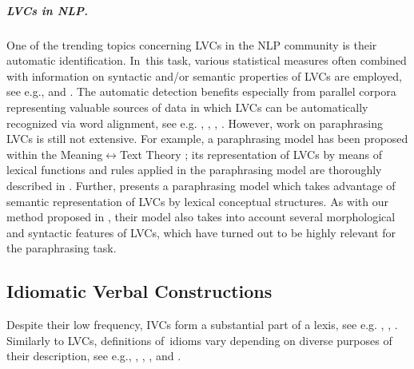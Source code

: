 \documentclass[output=paper
,modfonts
,nonflat]{langsci/langscibook}
\def\footurl#1{\footnote{\url{#1}}}
\begin{document}
\subparagraph{LVCs in NLP.} 
One of the trending topics concerning LVCs in the NLP community is their automatic 
identification. In~this task, various statistical measures often 
combined with information on syntactic and/or semantic properties of LVCs are
employed, see e.g., \citet{Bannard:2007} and \citet{fazly:2005}. The automatic 
detection benefits especially from parallel corpora representing valuable 
sources of data in which LVCs can be automatically recognized via word alignment, 
see e.g. \citet{Chen:2015}, \citet{Caseli2010}, \citet{Sinha:2009}, \citet{ZarrieB:2009}.     
However, work on paraphrasing LVCs is still not extensive. For example, a 
paraphrasing model has been proposed within the Meaning$\leftrightarrow$Text 
Theory \citep{ZolkovskijMelcuk65}; its representation of LVCs by means of lexical 
functions and rules applied in the paraphrasing model are thoroughly described in \citet{ramos-07}. 
Further, \citet{Fujita:2004} presents a paraphrasing model which 
takes advantage of semantic representation of LVCs by lexical conceptual structures. 
As with our method proposed in , their model also takes into 
account several morphological and syntactic features of LVCs, which have turned out 
to be highly relevant for the paraphrasing task.   

\subsection{Idiomatic Verbal Constructions}
\label{IVCs}
Despite their low frequency, IVCs form a substantial part of a lexis, see e.g. \citet{baldwin2010multiword}, \citet{Sag2002a}, \citet{cowie-01}.  Similarly to LVCs, 
definitions of~idioms vary depending on diverse purposes of their description, see e.g., \citet{healy-68}, \citet{fraser-70}, \citet{van1992incremental}, and \citet{nunberg-94}. 
\end{document}

